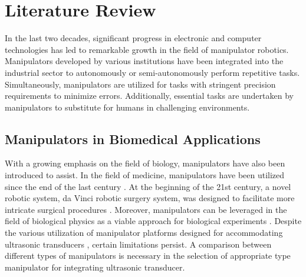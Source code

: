 \section{Literature Review} 
In the last two decades, significant progress in electronic and computer technologies has led to remarkable 
growth in the field of manipulator robotics. Manipulators developed by various institutions have been integrated 
into the industrial sector to autonomously or semi-autonomously perform repetitive tasks. Simultaneously, 
manipulators are utilized for tasks with stringent precision requirements to minimize errors. Additionally, 
essential tasks are undertaken by manipulators to substitute for humans in challenging environments. 
\subsection{Manipulators in Biomedical Applications}
With a growing emphasis on the field of biology, manipulators have also been introduced to assist. 
In the field of medicine, manipulators have been utilized since the end of the last century 
\cite{AESOP,ZEUS,ZEUS_example1,ZEUS_example2,ZEUS_example3}. At the beginning of the 21st century, a novel 
robotic system, da Vinci robotic surgery system, was designed to facilitate more intricate surgical procedures 
\cite{da_Vinci}. Moreover, manipulators can be leveraged in the field of biological physics as a viable approach 
for biological experiments \cite{HIFU2017,FUSBOT,FUSBOT_example1,FUSBOT_example2}. Despite the various utilization 
of manipulator platforms designed for accommodating ultrasonic transducers \cite{6DOF_HIFU,6DOF_HIFU_comp,6DOF_HIFU_ABB}, 
certain limitations persist. A comparison between different types of manipulators is necessary in the 
selection of appropriate type manipulator for integrating ultrasonic transducer. 
